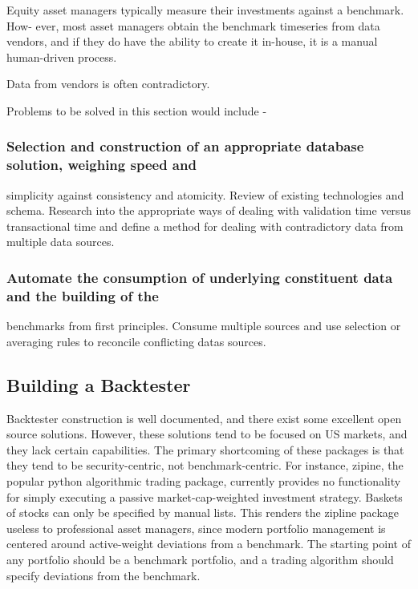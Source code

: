 \documentclass[11pt,preprint, authoryear]{elsarticle}
\numberwithin{equation}{section}
\numberwithin{figure}{section}
\numberwithin{table}{section}
\begin{document}
Equity asset managers typically measure their investments against a
benchmark. How- ever, most asset managers obtain the benchmark
timeseries from data vendors, and if they do have the ability to create
it in-house, it is a manual human-driven process.

Data from vendors is often contradictory.

Problems to be solved in this section would include -

\subsubsection{Selection and construction of an appropriate database
solution, weighing speed
and}\label{selection-and-construction-of-an-appropriate-database-solution-weighing-speed-and}

simplicity against consistency and atomicity. Review of existing
technologies and schema. Research into the appropriate ways of dealing
with validation time versus transactional time and define a method for
dealing with contradictory data from multiple data sources.

\subsubsection{Automate the consumption of underlying constituent data
and the building of
the}\label{automate-the-consumption-of-underlying-constituent-data-and-the-building-of-the}

benchmarks from first principles. Consume multiple sources and use
selection or averaging rules to reconcile conflicting datas sources.

\subsection{Building a Backtester}\label{building-a-backtester}

Backtester construction is well documented, and there exist some
excellent open source solutions. However, these solutions tend to be
focused on US markets, and they lack certain capabilities. The primary
shortcoming of these packages is that they tend to be security-centric,
not benchmark-centric. For instance, zipine, the popular python
algorithmic trading package, currently provides no functionality for
simply executing a passive market-cap-weighted investment strategy.
Baskets of stocks can only be specified by manual lists. This renders
the zipline package useless to professional asset managers, since modern
portfolio management is centered around active-weight deviations from a
benchmark. The starting point of any portfolio should be a benchmark
portfolio, and a trading algorithm should specify deviations from the
benchmark.
\end{document}
